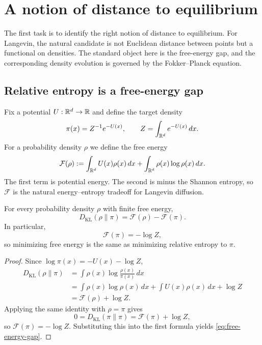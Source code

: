 \documentclass[11pt]{article}
\begin{document}
\section{A notion of distance to equilibrium}
\label{sec:free-energy-fokker-planck}

The first task is to identify the right notion of distance to equilibrium.
For Langevin, the natural candidate is not Euclidean distance between points but a functional on densities.
The standard object here is the free-energy gap, and the corresponding density evolution is governed by the Fokker--Planck equation.

\subsection{Relative entropy is a free-energy gap}
\label{subsec:free-energy-gap}

Fix a potential $U:\mathbb{R}^d\to\mathbb{R}$ and define the target density
\[
\pi(x)=Z^{-1}e^{-U(x)},
\qquad
Z=\int_{\mathbb{R}^d} e^{-U(x)}\,dx.
\]
For a probability density $\rho$ we define the free energy
\begin{equation}
  \mathcal{F}(\rho)
  :=
  \int_{\mathbb{R}^d} U(x)\rho(x)\,dx
  +
  \int_{\mathbb{R}^d} \rho(x)\log \rho(x)\,dx.
  \label{eq:free-energy-definition}
\end{equation}
The first term is potential energy.
The second is minus the Shannon entropy, so $\mathcal{F}$ is the natural energy--entropy tradeoff for Langevin diffusion.

\begin{proposition}
\label{prop:free-energy-kl}
For every probability density $\rho$ with finite free energy,
\begin{equation}
  D_{\mathrm{KL}}(\rho\|\pi)
  =
  \mathcal{F}(\rho)-\mathcal{F}(\pi).
  \label{eq:free-energy-gap}
\end{equation}
In particular,
\[
\mathcal{F}(\pi)=-\log Z,
\]
so minimizing free energy is the same as minimizing relative entropy to $\pi$.
\end{proposition}

\begin{proof}
Since $\log \pi(x)=-U(x)-\log Z$,
\begin{align*}
  D_{\mathrm{KL}}(\rho\|\pi)
  &=
  \int \rho(x)\log\frac{\rho(x)}{\pi(x)}\,dx \\
  &=
  \int \rho(x)\log \rho(x)\,dx
  +
  \int U(x)\rho(x)\,dx
  +
  \log Z \\
  &=
  \mathcal{F}(\rho)+\log Z.
\end{align*}
Applying the same identity with $\rho=\pi$ gives
\[
0=D_{\mathrm{KL}}(\pi\|\pi)=\mathcal{F}(\pi)+\log Z,
\]
so $\mathcal{F}(\pi)=-\log Z$.
Substituting this into the first formula yields \eqref{eq:free-energy-gap}.%
\end{proof}
\end{document}
